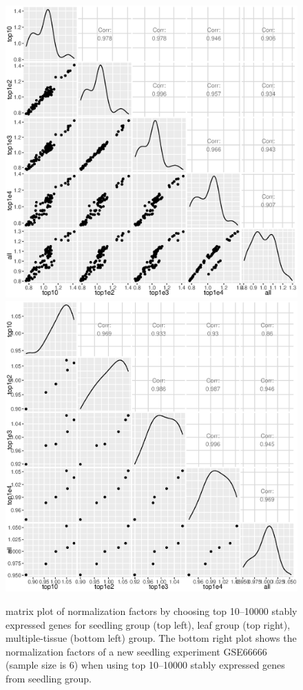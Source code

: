 \documentclass[11pt, a4paper]{article}
\begin{document}
\begin{figure}[h!]
\begin{center}
\includegraphics[scale=0.2]{Figures/norm3.eps}
\includegraphics[scale=0.2]{Figures/norm4.eps}
\caption{\label{fig:normfactor} matrix plot of normalization factors by choosing top 10--10000 stably expressed genes for seedling group (top left), leaf group (top right), multiple-tissue (bottom left) group. The bottom right plot shows the normalization factors of a new seedling experiment GSE66666 (sample size is 6) when using top 10--10000 stably expressed genes from seedling group.}
\end{center}
\end{figure}
\end{document}
